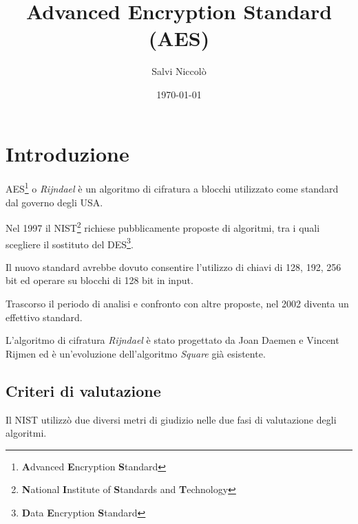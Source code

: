 \documentclass[a4paper,11pt]{article}
\title{Advanced Encryption Standard\\(AES)}
\author{Salvi Niccolò}
\date{\today}
\begin{document}
\maketitle
\tableofcontents
\newpage

\section{Introduzione}
AES\footnote{\textbf{A}dvanced \textbf{E}ncryption \textbf{S}tandard} o \textit{Rijndael} è un algoritmo di cifratura a blocchi utilizzato come standard dal governo degli USA.

Nel 1997 il NIST\footnote{\textbf{N}ational \textbf{I}nstitute of \textbf{S}tandards and \textbf{T}echnology} richiese pubblicamente proposte di algoritmi, tra i quali scegliere il sostituto del DES\footnote{\textbf{D}ata \textbf{E}ncryption \textbf{S}tandard}.

Il nuovo standard avrebbe dovuto consentire l'utilizzo di chiavi di 128, 192, 256 bit ed operare su blocchi di 128 bit in input.

Trascorso il periodo di analisi e confronto con altre proposte, nel 2002 diventa un effettivo standard.

L'algoritmo di cifratura \textit{Rijndael} è stato progettato da Joan Daemen e Vincent Rijmen ed è un'evoluzione dell'algoritmo \textit{Square} già esistente.

\subsection{Criteri di valutazione}
Il NIST utilizzò due diversi metri di giudizio nelle due fasi di valutazione degli algoritmi.
\end{document}
